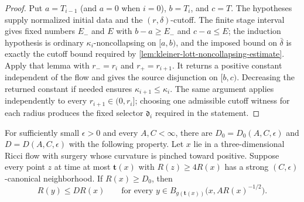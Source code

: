 \begin{proof}
Put $a=T_{i-1}$ (and $a=0$ when $i=0$), $b=T_i$, and $c=T$.  The
  hypotheses supply normalized initial data and the $(r,\delta)$-cutoff.  The
  finite stage interval gives fixed numbers $E_-$ and
$E$ with $b-a\ge E_-$ and $c-a\le E$; the induction hypothesis is ordinary
$\kappa_i$-noncollapsing on $[a,b)$, and the imposed bound on $\bar\delta$ is
exactly the cutoff bound required by
\ref{lem:kleiner-lott-noncollapsing-estimate}.  Apply that lemma with
$r_-=r_i$ and $r_+=r_{i+1}$.  It returns a positive constant independent of
the flow and gives the source disjunction on $[b,c)$.  Decreasing the returned
constant if needed
ensures $\kappa_{i+1}\le\kappa_i$.  The same argument applies independently
to every $r_{i+1}\in(0,r_i]$; choosing one admissible cutoff witness for each
radius produces the fixed selector $\mathfrak d_i$ required in the statement.
\end{proof}

\begin{theorem}
\label{thm:bounded-curvature-at-bounded-distance}
\notready
For sufficiently small $\epsilon>0$ and every $A,C<\infty$, there are
$D_0=D_0(A,C,\epsilon)$ and $D=D(A,C,\epsilon)$ with the following
property.  Let $x$ lie in a three-dimensional Ricci flow with surgery whose
curvature is pinched toward positive.  Suppose every point $z$ at time at
most $\mathbf t(x)$ with $R(z)\ge4R(x)$ has a strong
$(C,\epsilon)$-canonical neighborhood.  If $R(x)\ge D_0$, then
\[
 R(y)\le D R(x)
 \qquad\text{for every }y\in
 B_{g(\mathbf t(x))}\bigl(x,A R(x)^{-1/2}\bigr).
\]
\end{theorem}

